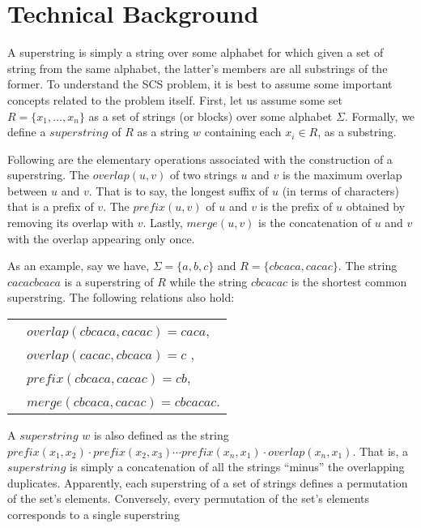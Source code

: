 \chapter{Technical Background}

A superstring is simply a string over
some alphabet for which given a set of string from the same
alphabet, the latter's members are all substrings of the former.
To understand the SCS problem, it is best to assume some important concepts
related to the problem itself. First, let
us assume some set $R = \{x_1, \ldots , x_n\}$ as
 a set of strings (or blocks) over some alphabet $\Sigma$. 
Formally, we define a $superstring$ of $R$ as a 
string $w$ containing each $x_i \in R$, as a substring.

Following are the elementary operations associated 
with the construction of a superstring.
The $overlap(u, v)$ of two strings $u$ and $v$ 
is the maximum overlap between $u$ and $v$. That is to say,
the longest suffix of $u$ (in terms of characters) that is a prefix of $v$.
The $prefix(u, v)$ of $u$ and $v$ is the prefix of $u$
obtained by removing its overlap with $v$.
Lastly, $merge(u, v)$ is the
 concatenation of $u$ and $v$ with the overlap appearing
only once.

As an example, say we have, $\Sigma = \{a, b, c\}$ and $R = \{cbcaca, cacac\}$.
The string $cacacbcaca$ is a superstring of $R$ while the string
$cbcacac$ is the shortest common superstring. The
following relations also hold: 

\begin{tabular}{p{0.5cm}l}
&$overlap(cbcaca, cacac) = caca$, \\
&$overlap(cacac, cbcaca) = c$ ,\\
&$prefix(cbcaca, cacac) = cb$,\\
&$merge(cbcaca, cacac) = cbcacac$.
\end{tabular}

A $superstring$ $w$ is also defined as
 the string $prefix(x_1, x_2) \cdot prefix(x_2, x_3) \cdots prefix(x_n, x_1) \cdot overlap(x_n, x_1)$.
That is, a $superstring$ is simply
 a concatenation of all the strings ``minus'' the overlapping duplicates.
 Apparently, each superstring of a set of strings defines a permutation of the set’s elements.
Conversely, every permutation of the set’s elements corresponds to a single superstring
			 
